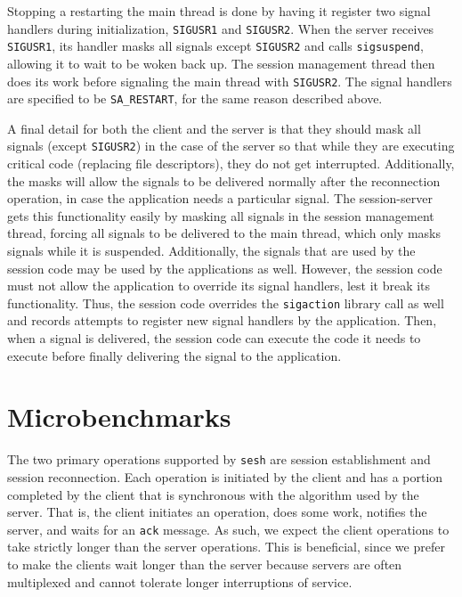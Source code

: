 \documentclass[twocolumn,11pt]{article}
\newcommand{\sesh}{\texttt{sesh}\xspace}
\begin{document}
Stopping a restarting the main thread is done by having it register two signal
handlers during initialization, \texttt{SIGUSR1} and \texttt{SIGUSR2}. When the
server receives \texttt{SIGUSR1}, its handler masks all signals except
\texttt{SIGUSR2} and calls \texttt{sigsuspend}, allowing it to wait to be woken
back up. The session management thread then does its work before signaling the
main thread with \texttt{SIGUSR2}. The signal handlers are specified to be
\texttt{SA\_RESTART}, for the same reason described above.

A final detail for both the client and the server is that they should mask all
signals (except \texttt{SIGUSR2}) in the case of the server so that while they
are executing critical code (replacing file descriptors), they do not get
interrupted. Additionally, the masks will allow the signals to be delivered
normally after the reconnection operation, in case the application needs a
particular signal. The session-server gets this functionality easily by masking
all signals in the session management thread, forcing all signals to be
delivered to the main thread, which only masks signals while it is suspended.
Additionally, the signals that are used by the session code may be used
by the applications as well. However, the session code must not allow the
application to override its signal handlers, lest it break its functionality.
Thus, the session code overrides the \texttt{sigaction} library call as well and
records attempts to register new signal handlers by the application. Then, when
a signal is delivered, the session code can execute the code it needs to execute
before finally delivering the signal to the application.

\section{Microbenchmarks}

The two primary operations supported by \sesh are session establishment and
session reconnection. Each operation is initiated by the client and has a
portion completed by the client that is synchronous with the algorithm used by
the server. That is, the client initiates an operation, does some work, notifies
the server, and waits for an \texttt{ack} message. As such, we expect the client
operations to take strictly longer than the server operations. This is
beneficial, since we prefer to make the clients wait longer than the server
because servers are often multiplexed and cannot tolerate longer interruptions
of service.
\end{document}
